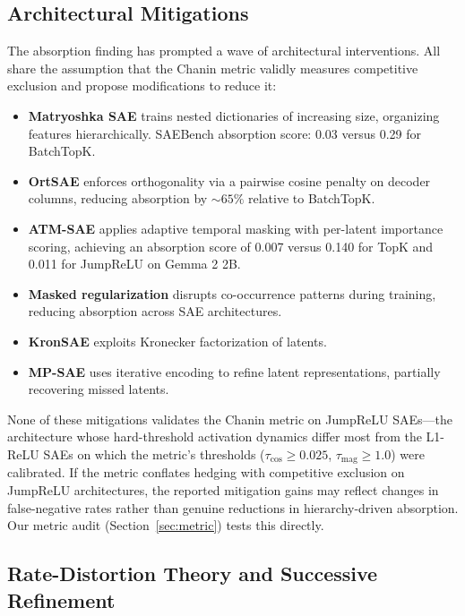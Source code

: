 \documentclass{article}
\begin{document}
\subsection{Architectural Mitigations}

The absorption finding has prompted a wave of architectural interventions. All share the assumption that the Chanin metric validly measures competitive exclusion and propose modifications to reduce it:

\begin{itemize}
\item \textbf{Matryoshka SAE} \citep{bussmann2025matryoshka} trains nested dictionaries of increasing size, organizing features hierarchically. SAEBench absorption score: 0.03 versus 0.29 for BatchTopK.
\item \textbf{OrtSAE} \citep{korznikov2025ortsae} enforces orthogonality via a pairwise cosine penalty on decoder columns, reducing absorption by ${\sim}65\%$ relative to BatchTopK.
\item \textbf{ATM-SAE} \citep{li2025atm} applies adaptive temporal masking with per-latent importance scoring, achieving an absorption score of 0.007 versus 0.140 for TopK and 0.011 for JumpReLU on Gemma 2 2B.
\item \textbf{Masked regularization} \citep{narayanaswamy2026masked} disrupts co-occurrence patterns during training, reducing absorption across SAE architectures.
\item \textbf{KronSAE} \citep{kronsae2025} exploits Kronecker factorization of latents.
\item \textbf{MP-SAE} \citep{costa2025mpsae} uses iterative encoding to refine latent representations, partially recovering missed latents.
\end{itemize}

None of these mitigations validates the Chanin metric on JumpReLU SAEs---the architecture whose hard-threshold activation dynamics differ most from the L1-ReLU SAEs on which the metric's thresholds ($\tau_{\cos} \geq 0.025$, $\tau_{\text{mag}} \geq 1.0$) were calibrated. If the metric conflates hedging with competitive exclusion on JumpReLU architectures, the reported mitigation gains may reflect changes in false-negative rates rather than genuine reductions in hierarchy-driven absorption. Our metric audit (Section~\ref{sec:metric}) tests this directly.

\subsection{Rate-Distortion Theory and Successive Refinement}
\end{document}

